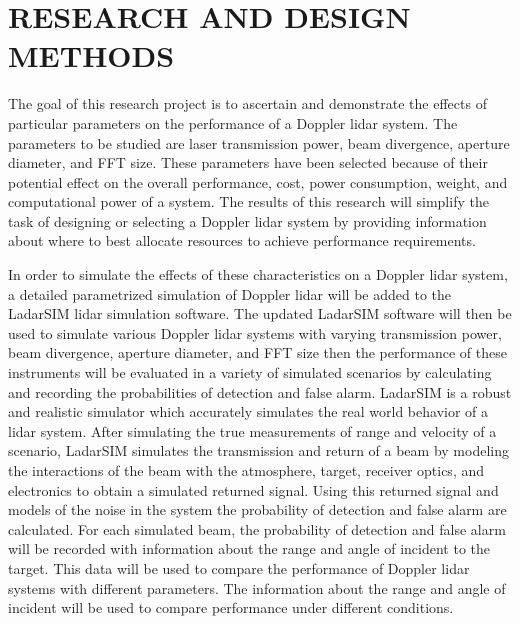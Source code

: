 %
%
%
%

\chapter{RESEARCH AND DESIGN METHODS}
The goal of this research project is to ascertain and demonstrate the effects
of particular parameters on the performance of a Doppler lidar system.
The parameters to be studied are laser transmission power, beam divergence,
aperture diameter, and FFT size.
These parameters have been selected because of their potential effect on
the overall performance, cost, power consumption, weight, and computational
power of a system.
The results of this research will simplify the task of designing or selecting
a Doppler lidar system by providing information about where to best allocate
resources to achieve performance requirements.

In order to simulate the effects of these characteristics on a Doppler lidar
system, a detailed parametrized simulation of Doppler lidar will be added
to the LadarSIM lidar simulation software.
The updated LadarSIM software will then be used to simulate various Doppler
lidar systems with varying transmission power, beam divergence, aperture
diameter, and FFT size then the performance of these instruments will be
evaluated in a variety of simulated scenarios by calculating and recording
the probabilities of detection and false alarm.
LadarSIM is a robust and realistic simulator which accurately simulates
the real world behavior of a lidar system.
After simulating the true measurements of range and velocity of a scenario,
LadarSIM simulates the transmission and return of a beam by modeling the
interactions of the beam with the atmosphere, target, receiver optics,
and electronics to obtain a simulated returned signal.
Using this returned signal and models of the noise in the system the probability
of detection and false alarm are calculated.
For each simulated beam, the probability of detection and false alarm will
be recorded with information about the range and angle of incident to the
target.
This data will be used to compare the performance of Doppler lidar systems
with different parameters.
The information about the range and angle of incident will be used to compare
performance under different conditions.

